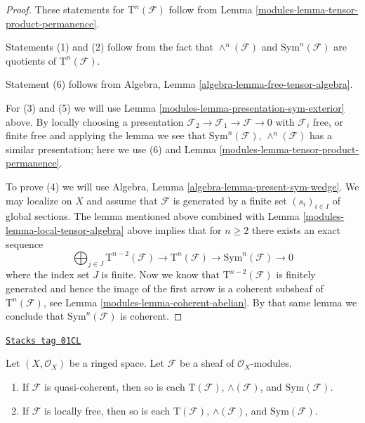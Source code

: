 \begin{proof}

These statements for $\text{T}^n(\mathcal{F})$ follow
from Lemma \ref{modules-lemma-tensor-product-permanence}.

\medskip\noindent
Statements (1) and (2) follow from the fact that
$\wedge^n(\mathcal{F})$ and $\text{Sym}^n(\mathcal{F})$
are quotients of $\text{T}^n(\mathcal{F})$.

\medskip\noindent
Statement (6) follows from
Algebra, Lemma \ref{algebra-lemma-free-tensor-algebra}.

\medskip\noindent
For (3) and (5) we will use
Lemma \ref{modules-lemma-presentation-sym-exterior} above.
By locally choosing a presentation
$\mathcal{F}_2 \to \mathcal{F}_1 \to \mathcal{F} \to 0$
with $\mathcal{F}_i$ free, or finite free and applying the
lemma we see that $\text{Sym}^n(\mathcal{F})$, $\wedge^n(\mathcal{F})$
has a similar presentation; here we use (6) and
Lemma \ref{modules-lemma-tensor-product-permanence}.

\medskip\noindent
To prove (4) we will use
Algebra, Lemma \ref{algebra-lemma-present-sym-wedge}.
We may localize on $X$ and assume that
$\mathcal{F}$ is generated by a finite set
$(s_i)_{i \in I}$ of global sections.
The lemma mentioned above
combined with Lemma \ref{modules-lemma-local-tensor-algebra} above
implies that for $n \geq 2$
there exists an exact sequence
$$
\bigoplus\nolimits_{j \in J}
\text{T}^{n - 2}(\mathcal{F})
\to
\text{T}^n(\mathcal{F})
\to
\text{Sym}^n(\mathcal{F})
\to
0
$$
where the index set $J$ is finite. Now we know that
$\text{T}^{n - 2}(\mathcal{F})$ is finitely generated
and hence the image of the first arrow is a coherent
subsheaf of $\text{T}^n(\mathcal{F})$, see Lemma \ref{modules-lemma-coherent-abelian}.
By that same lemma we conclude that $\text{Sym}^n(\mathcal{F})$ is
coherent.
\end{proof}

\begin{lemma}
\label{modules-lemma-whole-tensor-algebra-permanence}
\href{https://stacks.math.columbia.edu/tag/01CL}{\texttt{Stacks tag 01CL}}

Let $(X, \mathcal{O}_X)$ be a ringed space.
Let $\mathcal{F}$ be a sheaf of $\mathcal{O}_X$-modules.
\begin{enumerate}
\item If $\mathcal{F}$ is quasi-coherent,
then so is each $\text{T}(\mathcal{F})$,
$\wedge(\mathcal{F})$, and $\text{Sym}(\mathcal{F})$.
\item If $\mathcal{F}$ is locally free,
then so is each $\text{T}(\mathcal{F})$,
$\wedge(\mathcal{F})$, and $\text{Sym}(\mathcal{F})$.
\end{enumerate}
\end{lemma}

